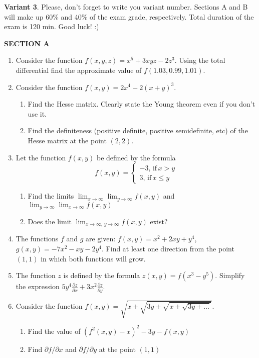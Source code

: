 \documentclass[12pt,a4paper]{article}
\begin{document}
\newpage
\thispagestyle{empty}
\textbf{Variant 3}. Please, don't forget to write you variant number. Sections A and B will make up 60\% and 40\% of the exam grade, respectively. Total duration of the exam is 120 min. Good luck! :) 



\textbf{SECTION A}

\begin{enumerate}

\item Consider the function $f(x,y,z)=x^5+3xyz-2z^3$. Using the total differential find the approximate value of $f(1.03,0.99,1.01)$.

\item Consider the function $f(x,y)=2x^4-2(x+y)^3$. 
\begin{enumerate}
\item Find the Hesse matrix. Clearly state the Young theorem even if you don't use it.
\item Find the definiteness (positive definite, positive semidefinite, etc) of the Hesse matrix at the point $(2,2)$.
\end{enumerate}

\item Let the function $f(x,y)$ be defined by the formula
\[
f(x,y)=\begin{cases}
-3, \, \text{if} \, x>y \\
3, \, \text{if} \, x\leq y
\end{cases}
\]

\begin{enumerate}
\item Find the limits $\lim_{x\to\infty}\lim_{y\to \infty} f(x,y)$ and $\lim_{y\to\infty}\lim_{x\to \infty} f(x,y)$
\item Does the limit $\lim_{x\to\infty, \, y\to \infty} f(x,y)$ exist?
\end{enumerate}


\item The functions $f$ and $g$ are given: $f(x,y)=x^2+2xy+y^4$, $g(x,y)=-7x^2-xy-2y^4$. Find at least one direction from the point $(1,1)$ in which both functions will grow.

\item The function $z$ is defined by the formula $z(x,y)=f(x^3-y^5)$. Simplify the expression $5y^4\frac{\partial z}{\partial x}+3x^2\frac{\partial z}{\partial y}$. 

\item Consider the function $f(x,y)=\sqrt{x+\sqrt{3y+\sqrt{x+\sqrt{3y + \ldots }}}}$. 
\begin{enumerate}
\item Find the value of $(f^2(x,y)-x)^2-3y-f(x,y)$
\item Find $\partial f/\partial x$ and $\partial f/\partial y$ at the point $(1,1)$
\end{enumerate}


\end{enumerate}
\end{document}
